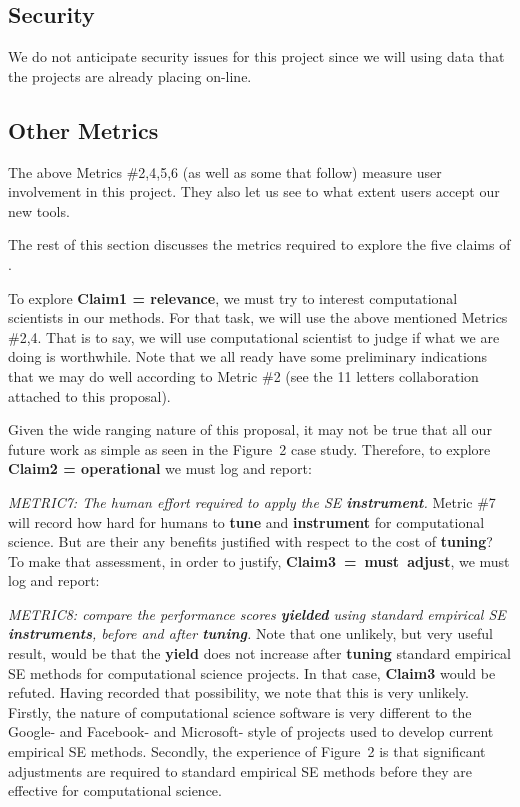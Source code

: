 \subsection{Security} 
We do not anticipate security issues for this project since we will using data that the projects are already placing on-line.

 
 
\subsection{Other Metrics}\label{tion:other}
The above Metrics \#2,4,5,6 (as well as some that follow)  measure
user involvement in this project. They also let us see to what extent
users accept our new tools.

The rest of this section discusses the metrics required
to explore  the
five claims of .   

To  explore   {\bf Claim1 = relevance}, we must try
to interest   computational scientists in our methods.
For that task, we will use the above mentioned
Metrics \#2,4.    That is to say, we will use computational scientist to judge if what we are doing
is worthwhile.  Note that we all ready have some preliminary indications that we may do well
according to Metric \#2 (see the 11 letters collaboration attached to this proposal).

Given the wide ranging nature of this
proposal, it may not be true that all our future
work as simple as seen in the Figure~2 case study.
Therefore, to explore  {\bf Claim2 = operational} we must log and report:
\bi
\item {\em METRIC7: The human effort
 required to apply the SE {\bf instrument}.} 
\ei
Metric \#7 will record how hard for humans to  {\bf tune} and {\bf instrument} for computational
science. But are their any benefits justified with respect to  the cost of {\bf tuning}?
To make that assessment, in order to justify,
 \mbox{{\bf Claim3 = must adjust}}, we must log and report:
\bi
\item {\em METRIC8: compare the  performance 
scores {\bf yielded}
using standard empirical SE {\bf instruments}, before and after {\bf tuning}.}
\ei
Note that one unlikely, but very useful result,
would be that the {\bf yield} does not
increase after {\bf tuning}
standard empirical SE methods for computational
science projects. In that case, {\bf Claim3} would be refuted.
Having recorded that possibility, we note that this is very unlikely.
Firstly, the nature of computational science software is very different to the Google- and Facebook- and Microsoft- style of projects used to develop current empirical SE
methods. Secondly, the experience of Figure~2 is that significant adjustments are required
to standard empirical SE methods before they are effective for computational science.

